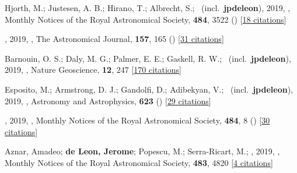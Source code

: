 \item[{\color{numcolor}\scriptsize99}] Hjorth, M.; Justesen, A. B.; Hirano, T.; Albrecht, S.; \etal\ (incl.\ \textbf{jpdeleon}), 2019, , Monthly Notices of the Royal Astronomical Society, \textbf{484}, 3522 () [\href{https://ui.adsabs.harvard.edu/abs/2019MNRAS.484.3522H}{18 citations}]

\item[{\color{numcolor}\scriptsize98}] , 2019, , The Astronomical Journal, \textbf{157}, 165 () [\href{https://ui.adsabs.harvard.edu/abs/2019AJ....157..165A}{31 citations}]

\item[{\color{numcolor}\scriptsize97}] Barnouin, O. S.; Daly, M. G.; Palmer, E. E.; Gaskell, R. W.; \etal\ (incl.\ \textbf{jpdeleon}), 2019, , Nature Geoscience, \textbf{12}, 247 [\href{https://ui.adsabs.harvard.edu/abs/2019NatGe..12..247B}{170 citations}]

\item[{\color{numcolor}\scriptsize96}] Esposito, M.; Armstrong, D. J.; Gandolfi, D.; Adibekyan, V.; \etal\ (incl.\ \textbf{jpdeleon}), 2019, , Astronomy and Astrophysics, \textbf{623} () [\href{https://ui.adsabs.harvard.edu/abs/2019A&A...623A.165E}{29 citations}]

\item[{\color{numcolor}\scriptsize95}] , 2019, , Monthly Notices of the Royal Astronomical Society, \textbf{484}, 8 () [\href{https://ui.adsabs.harvard.edu/abs/2019MNRAS.484....8L}{30 citations}]

\item[{\color{numcolor}\scriptsize94}] Aznar, Amadeo; \textbf{de Leon, Jerome}; Popescu, M.; Serra-Ricart, M.; \etal, 2019, , Monthly Notices of the Royal Astronomical Society, \textbf{483}, 4820 [\href{https://ui.adsabs.harvard.edu/abs/2019MNRAS.483.4820A}{4 citations}]

